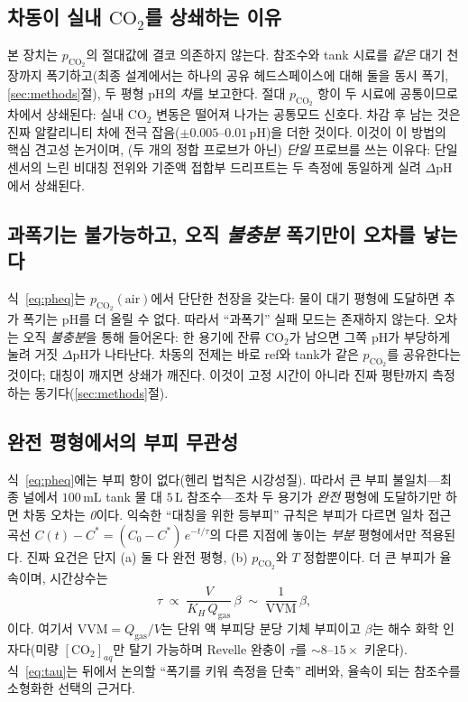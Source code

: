 \documentclass[11pt]{article}
\newcommand{\dpH}{\ensuremath{\Delta\mathrm{pH}}}
\newcommand{\co}{\ensuremath{\mathrm{CO_2}}}
\newcommand{\pco}{\ensuremath{p_{\mathrm{CO_2}}}}
\begin{document}
\subsection{차동이 실내 \co{}를 상쇄하는 이유}
본 장치는 \pco{}의 절대값에 결코 의존하지 않는다. 참조수와 tank 시료를 \emph{같은}
대기 천장까지 폭기하고(최종 설계에서는 하나의 공유 헤드스페이스에 대해 둘을 동시
폭기, \ref{sec:methods}절), 두 평형 pH의 \emph{차}를 보고한다. 절대 \pco{} 항이
두 시료에 공통이므로 차에서 상쇄된다: 실내 \co{} 변동은 떨어져 나가는 공통모드
신호다. 차감 후 남는 것은 진짜 알칼리니티 차에 전극 잡음($\pm0.005$--$0.01$\,pH)을
더한 것이다. 이것이 이 방법의 핵심 견고성 논거이며, (두 개의 정합 프로브가 아닌)
\emph{단일} 프로브를 쓰는 이유다: 단일 센서의 느린 비대칭 전위와 기준액 접합부
드리프트는 두 측정에 동일하게 실려 \dpH{}에서 상쇄된다.

\subsection{과폭기는 불가능하고, 오직 \emph{불충분} 폭기만이 오차를 낳는다}
식~\eqref{eq:pheq}는 $\pco{}(\mathrm{air})$에서 단단한 천장을 갖는다: 물이 대기
평형에 도달하면 추가 폭기는 pH를 더 올릴 수 없다. 따라서 ``과폭기'' 실패 모드는
존재하지 않는다. 오차는 오직 \emph{불충분}을 통해 들어온다: 한 용기에 잔류 \co{}가
남으면 그쪽 pH가 부당하게 눌려 거짓 \dpH{}가 나타난다. 차동의 전제는 바로 ref와
tank가 같은 \pco{}를 공유한다는 것이다; 대칭이 깨지면 상쇄가 깨진다. 이것이 고정
시간이 아니라 진짜 평탄까지 측정하는 동기다(\ref{sec:methods}절).

\subsection{완전 평형에서의 부피 무관성}
식~\eqref{eq:pheq}에는 부피 항이 없다(헨리 법칙은 시강성질). 따라서 큰 부피
불일치---최종 널에서 $100\,\mathrm{mL}$ tank 물 대 $5\,\mathrm{L}$ 참조수---조차
두 용기가 \emph{완전} 평형에 도달하기만 하면 차동 오차는 \emph{0}이다. 익숙한
``대칭을 위한 등부피'' 규칙은 부피가 다르면 일차 접근 곡선
$C(t)-C^\ast = (C_0-C^\ast)\,e^{-t/\tau}$의 다른 지점에 놓이는 \emph{부분} 평형에서만
적용된다. 진짜 요건은 단지 (a) 둘 다 완전 평형, (b) \pco{}와 $T$ 정합뿐이다. 더 큰
부피가 율속이며, 시간상수는
\begin{equation}
\tau \;\propto\; \frac{V}{K_H\,Q_\mathrm{gas}}\,\beta
\;\sim\; \frac{1}{\mathrm{VVM}}\,\beta,
\label{eq:tau}
\end{equation}
이다. 여기서 $\mathrm{VVM}=Q_\mathrm{gas}/V$는 단위 액 부피당 분당 기체 부피이고
$\beta$는 해수 화학 인자다(미량 $[\co{}]_{aq}$만 탈기 가능하며 Revelle 완충이 $\tau$를
$\sim8$--$15\times$ 키운다). 식~\eqref{eq:tau}는 뒤에서 논의할 ``폭기를 키워 측정을
단축'' 레버와, 율속이 되는 참조수를 소형화한 선택의 근거다.
\end{document}

